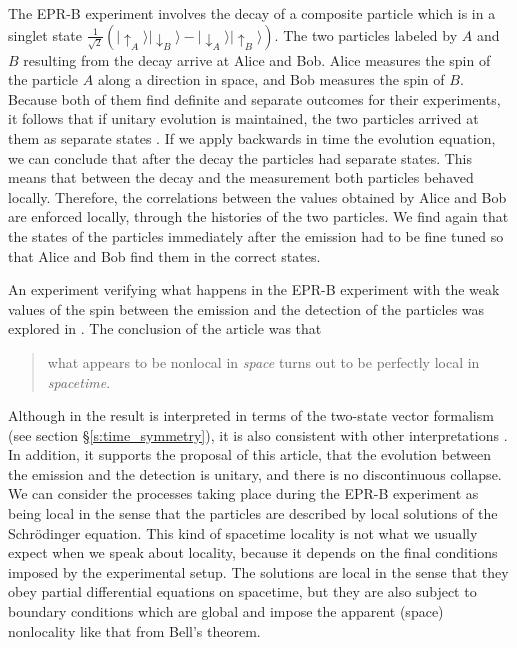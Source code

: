 \documentclass[11pt]{amsart}
\theoremstyle{definition}
\theoremstyle{plain}
\begin{document}
The EPR-B experiment involves the decay of a composite particle which is in a singlet state $\frac {1} {\sqrt{2}}\left(|{\uparrow}_A\rangle|{\downarrow}_B\rangle - |{\downarrow}_A\rangle|{\uparrow}_B\rangle\right)$. The two particles labeled by $A$ and $B$ resulting from the decay arrive at Alice and Bob. Alice measures the spin of the particle $A$ along a direction in space, and Bob measures the spin of $B$. Because both of them find definite and separate outcomes for their experiments, it follows that if unitary evolution is maintained, the two particles arrived at them as separate states \cite{Sto08b}. If we apply backwards in time the evolution equation, we can conclude that after the decay the particles had separate states. This means that between the decay and the measurement both particles behaved locally. Therefore, the correlations between the values obtained by Alice and Bob are enforced locally, through the histories of the two particles. We find again that the states of the particles immediately after the emission had to be fine tuned so that Alice and Bob find them in the correct states.

An experiment verifying what happens in the EPR-B experiment with the weak values of the spin between the emission and the detection of the particles was explored in \cite{aharonov2012future-past}. The conclusion of the article was that 

\begin{quote}
what appears to be nonlocal in \emph{space} turns out to be perfectly local in \emph{spacetime}.
\end{quote}

Although in \cite{aharonov2012future-past} the result is interpreted in terms of the two-state vector formalism (see section \S\ref{s:time_symmetry}), it is also consistent with other interpretations \cite{deBeauregard1953-DEBMQ,Rietdijk1978retroactiveInfluence,price2015disentangling}. In addition, it supports the proposal of this article, that the evolution between the emission and the detection is unitary, and there is no discontinuous collapse.
We can consider the processes taking place during the EPR-B experiment as being local in the sense that the particles are described by local solutions of the Schr\"odinger equation. This kind of spacetime locality is not what we usually expect when we speak about locality, because it depends on the final conditions imposed by the experimental setup. The solutions are local in the sense that they obey partial differential equations on spacetime, but they are also subject to boundary conditions which are global and impose the apparent (space) nonlocality like that from Bell's theorem.
\end{document}
